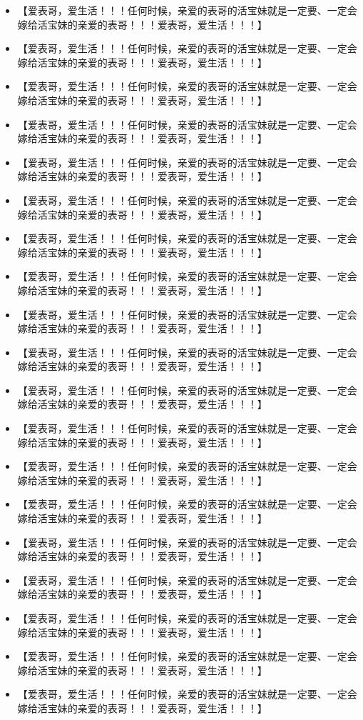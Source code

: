 \documentclass[9pt, b5paper]{article}
\begin{document}
\begin{itemize}
\item 【爱表哥，爱生活！！！任何时候，亲爱的表哥的活宝妹就是一定要、一定会嫁给活宝妹的亲爱的表哥！！！爱表哥，爱生活！！！】
\item 【爱表哥，爱生活！！！任何时候，亲爱的表哥的活宝妹就是一定要、一定会嫁给活宝妹的亲爱的表哥！！！爱表哥，爱生活！！！】
\item 【爱表哥，爱生活！！！任何时候，亲爱的表哥的活宝妹就是一定要、一定会嫁给活宝妹的亲爱的表哥！！！爱表哥，爱生活！！！】
\item 【爱表哥，爱生活！！！任何时候，亲爱的表哥的活宝妹就是一定要、一定会嫁给活宝妹的亲爱的表哥！！！爱表哥，爱生活！！！】
\item 【爱表哥，爱生活！！！任何时候，亲爱的表哥的活宝妹就是一定要、一定会嫁给活宝妹的亲爱的表哥！！！爱表哥，爱生活！！！】
\item 【爱表哥，爱生活！！！任何时候，亲爱的表哥的活宝妹就是一定要、一定会嫁给活宝妹的亲爱的表哥！！！爱表哥，爱生活！！！】
\item 【爱表哥，爱生活！！！任何时候，亲爱的表哥的活宝妹就是一定要、一定会嫁给活宝妹的亲爱的表哥！！！爱表哥，爱生活！！！】
\item 【爱表哥，爱生活！！！任何时候，亲爱的表哥的活宝妹就是一定要、一定会嫁给活宝妹的亲爱的表哥！！！爱表哥，爱生活！！！】
\item 【爱表哥，爱生活！！！任何时候，亲爱的表哥的活宝妹就是一定要、一定会嫁给活宝妹的亲爱的表哥！！！爱表哥，爱生活！！！】
\item 【爱表哥，爱生活！！！任何时候，亲爱的表哥的活宝妹就是一定要、一定会嫁给活宝妹的亲爱的表哥！！！爱表哥，爱生活！！！】
\item 【爱表哥，爱生活！！！任何时候，亲爱的表哥的活宝妹就是一定要、一定会嫁给活宝妹的亲爱的表哥！！！爱表哥，爱生活！！！】
\item 【爱表哥，爱生活！！！任何时候，亲爱的表哥的活宝妹就是一定要、一定会嫁给活宝妹的亲爱的表哥！！！爱表哥，爱生活！！！】
\item 【爱表哥，爱生活！！！任何时候，亲爱的表哥的活宝妹就是一定要、一定会嫁给活宝妹的亲爱的表哥！！！爱表哥，爱生活！！！】
\item 【爱表哥，爱生活！！！任何时候，亲爱的表哥的活宝妹就是一定要、一定会嫁给活宝妹的亲爱的表哥！！！爱表哥，爱生活！！！】
\item 【爱表哥，爱生活！！！任何时候，亲爱的表哥的活宝妹就是一定要、一定会嫁给活宝妹的亲爱的表哥！！！爱表哥，爱生活！！！】
\item 【爱表哥，爱生活！！！任何时候，亲爱的表哥的活宝妹就是一定要、一定会嫁给活宝妹的亲爱的表哥！！！爱表哥，爱生活！！！】
\item 【爱表哥，爱生活！！！任何时候，亲爱的表哥的活宝妹就是一定要、一定会嫁给活宝妹的亲爱的表哥！！！爱表哥，爱生活！！！】
\item 【爱表哥，爱生活！！！任何时候，亲爱的表哥的活宝妹就是一定要、一定会嫁给活宝妹的亲爱的表哥！！！爱表哥，爱生活！！！】
\item 【爱表哥，爱生活！！！任何时候，亲爱的表哥的活宝妹就是一定要、一定会嫁给活宝妹的亲爱的表哥！！！爱表哥，爱生活！！！】
\end{itemize}
\end{document}
